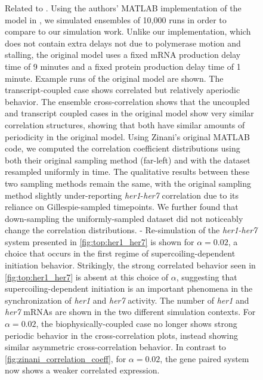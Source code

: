 \documentclass[11pt]{article} %
\begin{document}
\begin{figure}[htbp]
    \ContinuedFloat
    \caption{Related to .
        Using the authors' MATLAB implementation of the model in \textcite{zinaniPairingSegmentationClock2021}, we simulated ensembles of 10,000 runs in order to compare to our simulation work. Unlike our implementation, which does not contain extra delays not due to polymerase motion and stalling, the original model uses a fixed mRNA production delay time of 9 minutes and a fixed protein production delay time of 1 minute. Example runs of the original model are shown. The transcript-coupled case shows correlated but relatively aperiodic behavior.
         The ensemble cross-correlation shows that the uncoupled and transcript coupled cases in the original model show very similar correlation structures, showing that both have similar amounts of periodicity in the original model.
         Using Zinani's original MATLAB code, we computed the correlation coefficient distributions using both their original sampling method (far-left) and with the dataset resampled uniformly in time. The qualitative results between these two sampling methods remain the same, with the original sampling method slightly under-reporting \textit{her1}-\textit{her7} correlation due to its reliance on Gillespie-sampled timepoints. We further found that down-sampling the uniformly-sampled dataset did not noticeably change the correlation distributions.
        - Re-simulation of the \textit{her1-her7} system presented in \cref{fig:top:her1_her7} is shown for \(\alpha = 0.02\), a choice that occurs in the first regime of supercoiling-dependent initiation behavior. Strikingly, the strong correlated behavior seen in \cref{fig:top:her1_her7} is absent at this choice of \(\alpha\), suggesting that supercoiling-dependent initiation is an important phenomena in the synchronization of \textit{her1} and \textit{her7} activity.
         The number of \textit{her1} and \textit{her7} mRNAs are shown in the two different simulation contexts.
         For \(\alpha = 0.02\), the biophysically-coupled case no longer shows strong periodic behavior in the cross-correlation plots, instead showing similar asymmetric cross-correlation behavior.
         In contrast to \cref{fig:zinani_correlation_coeff}, for \(\alpha = 0.02\), the gene paired system now shows a weaker correlated expression.
}
\end{figure}
\end{document}
